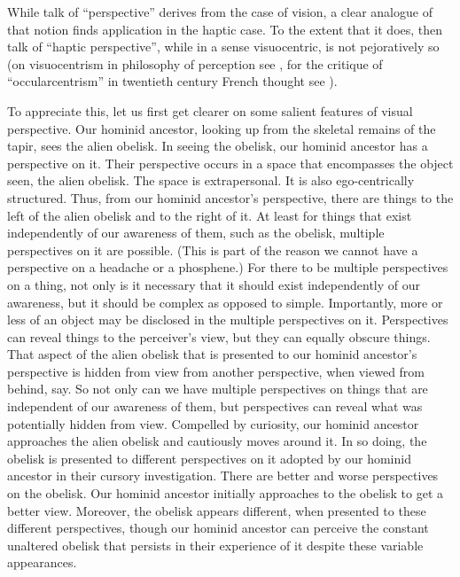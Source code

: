 While talk of ``perspective'' derives from the case of vision, a clear analogue of that notion finds application in the haptic case. To the extent that it does, then talk of ``haptic perspective'', while in a sense visuocentric, is not pejoratively so (on visuocentrism in philosophy of perception see \citealt{OCallaghan:2007xy}, for the critique of ``occularcentrism'' in twentieth century French thought see \citealt{Jay:1994aa}).

To appreciate this, let us first get clearer on some salient features of visual perspective. Our hominid ancestor, looking up from the skeletal remains of the tapir, sees the alien obelisk. In seeing the obelisk, our hominid ancestor has a perspective on it. Their perspective occurs in a space that encompasses the object seen, the alien obelisk. The space is extrapersonal. It is also ego-centrically structured. Thus, from our hominid ancestor's perspective, there are things to the left of the alien obelisk and to the right of it. At least for things that exist independently of our awareness of them, such as the obelisk, multiple perspectives on it are possible. (This is part of the reason we cannot have a perspective on a headache or a phosphene.) For there to be multiple perspectives on a thing, not only is it necessary that it should exist independently of our awareness, but it should be complex as opposed to simple. Importantly, more or less of an object may be disclosed in the multiple perspectives on it. Perspectives can reveal things to the perceiver's view, but they can equally obscure things. That aspect of the alien obelisk that is presented to our hominid ancestor's perspective is hidden from view from another perspective, when viewed from behind, say. So not only can we have multiple perspectives on things that are independent of our awareness of them, but perspectives can reveal what was potentially hidden from view. Compelled by curiosity, our hominid ancestor approaches the alien obelisk and cautiously moves around it. In so doing, the obelisk is presented to different perspectives on it adopted by our hominid ancestor in their cursory investigation. There are better and worse perspectives on the obelisk. Our hominid ancestor initially approaches to the obelisk to get a better view. Moreover, the obelisk appears different, when presented to these different perspectives, though our hominid ancestor can perceive the constant unaltered obelisk that persists in their experience of it despite these variable appearances.

